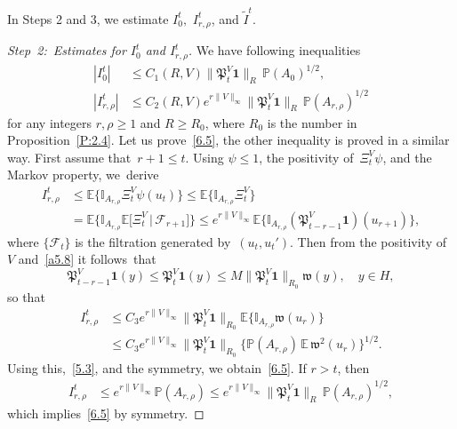 \documentclass[10pt]{amsart}
\theoremstyle{definition}\newtheorem{defi}[theo]{Definition}\newtheorem{rema}[theo]{Remark}\newtheorem{exam}[theo]{Example}\newtheorem{exem}[theo]{Example}\newtheorem{nota}[theo]{Notation}
\newcommand{\pP}{{\mathbb P}}
\newcommand{\I}{{\mathbb I}}
\newcommand{\E}{{\mathbb E}}
\newcommand{\FF}{{\mathcal F}}
\newcommand{\wwww}{{\mathfrak w}}
\newcommand{\PPPP}{{\mathfrak P}}
\newenvironment{step}{\begin{proof}}{\let\qed\relax \end{proof}}
\begin{document}
In Steps 2 and 3, we estimate $I_{0}^t,$ $I_{r,\rho}^t$, and $\tilde I^{t}$.

\begin{step}[Step~2:~Estimates for $I_{0}^t$ and $I_{r,\rho}^t$]
We have following inequalities
\begin{align}
|I_{0}^t|&\le C_1(R,V)\|\PPPP_t^V{\mathbf1}\|_R\,\pP(A_{0})^{1/2}, \label{6.5aaa}
\\
|I_{r,\rho}^t|&\le C_2(R,V)e^{r\|V\|_\infty}\|\PPPP_t^V{\mathbf1}\|_R\,\pP(A_{r,\rho})^{1/2} \label{6.5}
\end{align}
for any integers $r,\rho\ge1$ and $R\ge R_0$, where $R_0$ is the number in Proposition~\ref{P:2.4}. Let us prove~\eqref{6.5}, the other inequality is proved in a similar way. First assume that~$r+1\le t$. Using $ \psi \le 1$, the positivity of~$\Xi^V_t\psi $, and the Markov property, we~derive
\begin{align*}
I_{r,\rho}^t &\le\E\bigl\{\I_{A_{r,\rho}}\Xi^V_t\psi(u_t)\bigr\}
\le \E\bigl\{\I_{A_{r,\rho}}\Xi^V_t\bigr\}\\
&= \E\bigl\{\I_{A_{r,\rho}}\E\bigl[\Xi^V_t\,\big|\,\FF_{r+1}\bigr]\bigr\}
\le e^{r\|V\|_\infty}\E\bigl\{\I_{A_{r,\rho}}(\PPPP_{t-r-1}^V{\mathbf1})(u_{r+1})\bigr\},
\end{align*}
where $\{\FF_t\}$ is the filtration generated by~$(u_t,u_t')$. Then from the positivity of~$V$ and~\eqref{a5.8} it follows~that
\[
\PPPP_{t-r-1}^{V}{\mathbf1}(y)\le \PPPP_{t}^{V}{\mathbf1}(y)\le M\|\PPPP_{t}^{V}{\mathbf1}\|_{R_0}\wwww (y),\quad y\in H,
\]
so that
\begin{align*}
I_{r,\rho}^t &\le C_3 e^{r\|V\|_\infty}\|\PPPP_{t}^V{\mathbf1}\|_{R_0}\E\bigl\{\I_{A_{r,\rho}}\wwww (u_r)\bigr\}\\
&\le C_3 e^{r\|V\|_\infty}\|\PPPP_{t}^V{\mathbf1}\|_{R_0}\bigl\{\pP(A_{r,\rho})\,\E\,\wwww ^2(u_r)\bigr\}^{1/2}.
\end{align*}
Using this,~\eqref{5.3}, and the symmetry, we obtain~\eqref{6.5}. If $r> t$, then
\begin{align*}
I_{r,\rho}^t &
\le e^{r\|V\|_\infty}\pP(A_{r,\rho})\le e^{r\|V\|_\infty} \|\PPPP_t^V{\mathbf1}\|_R\,\pP(A_{r,\rho})^{1/2},
\end{align*}
which implies~\eqref{6.5} by symmetry.
\end{step}
\end{document}
